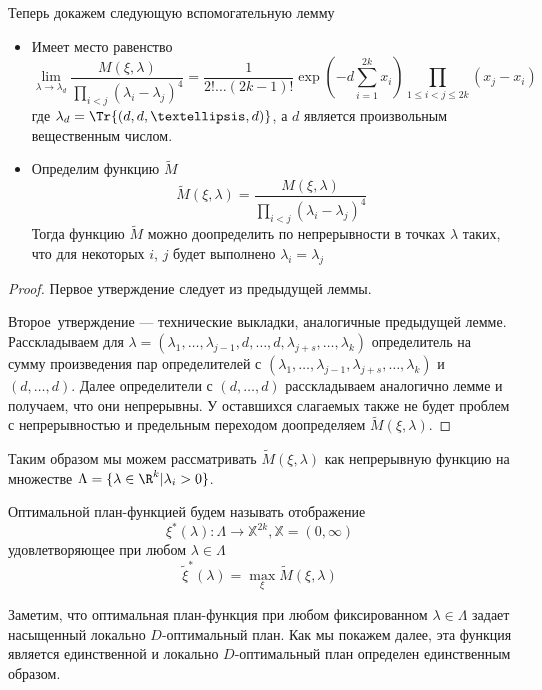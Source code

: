 Теперь докажем следующую вспомогательную лемму
\begin{lem}
\begin{itemize}
\item
Имеет место равенство
\begin{equation}
\lim \limits_{\lambda \rightarrow \lambda_d} \frac{M(\xi, \lambda)}{\prod\limits_{i < j}(\lambda_i - \lambda_j)^4} = \frac{1}{2!…(2k-1)!}\exp\left(-d\sum\limits_{i=1}^{2k}x_i\right)\prod\limits_{1 \leq i < j \leq 2k}(x_j - x_i)
\end{equation}
где $\lambda_d = \Tr{(d, d,…,d)}$, а $d$ является произвольным вещественным числом.

\item Определим функцию $\tilde{M}$
\begin{equation}
\tilde{M}(\xi, \lambda) = \frac{M(\xi, \lambda)}{\prod \limits_{i < j} (\lambda_i - \lambda_j)^4}
\end{equation}
Тогда функцию $\tilde{M}$ можно доопределить по непрерывности в точках $\lambda$  таких, что для некоторых $i$, $j$ будет выполнено $\lambda_i = \lambda_j$ 
\end{itemize}
\end{lem}
\begin{proof}
Первое утверждение следует из предыдущей леммы.

Второе утверждение — технические выкладки, аналогичные предыдущей лемме. Расскладываем для $\lambda = (\lambda_1, …, \lambda_{j-1}, d, …, d, \lambda_{j+s}, …,\lambda_{k})$ определитель на сумму произведения пар определителей с $(\lambda_1, …, \lambda_{j-1},  \lambda_{j+s}, …,\lambda_{k})$ и $(d, …, d)$. Далее определители с $(d, …, d)$ расскладываем аналогично лемме и получаем, что они непрерывны. У оставшихся слагаемых также не будет проблем с непрерывностью и предельным переходом доопределяем $\tilde{M}(\xi, \lambda)$.
\end{proof}


Таким образом мы можем рассматривать $\tilde{M}(\xi, \lambda)$ как непрерывную функцию на множестве $\Lambda = \{ \lambda \in \R^{k} | \lambda_i > 0\}$. 
\begin{dfn}
Оптимальной план-функцией будем называть отображение 
$$\xi^{*}(\lambda): \Lambda \rightarrow \mathbb{X}^{2k}, \mathbb{X} = (0, \infty)$$
удовлетворяющее при любом $\lambda \in \Lambda$
$$\tilde{\xi}^{*}(\lambda) = \max\limits_{\xi}\tilde{M}(\xi, \lambda)$$
\end{dfn}
Заметим, что оптимальная план-функция при любом фиксированном $\lambda \in \Lambda$  задает насыщенный локально $D$-оптимальный план. Как мы покажем далее, эта функция является единственной и локально $D$-оптимальный план определен единственным образом.

